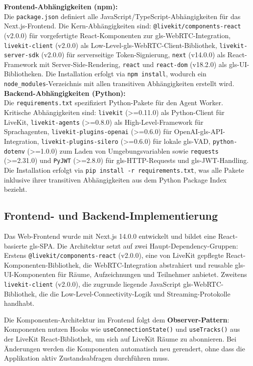\textbf{Frontend-Abhängigkeiten (npm):}\\
Die \texttt{package.json} definiert alle JavaScript/TypeScript-Abhängigkeiten für das Next.js-Frontend. Die Kern-Abhängigkeiten sind: \texttt{@livekit/components-react} (v2.0.0) für vorgefertigte React-Komponenten zur \gls{gls-WebRTC}-Integration, \texttt{livekit-client} (v2.0.0) als Low-Level-\gls{gls-WebRTC}-Client-Bibliothek, \texttt{livekit-server-sdk} (v2.0.0) für serverseitige Token-Signierung, \texttt{next} (v14.0.0) als React-Framework mit Server-Side-Rendering, \texttt{react} und \texttt{react-dom} (v18.2.0) als \gls{gls-UI}-Bibliotheken. Die Installation erfolgt via \texttt{npm install}, wodurch ein \texttt{node\_modules}-Verzeichnis mit allen transitiven Abhängigkeiten erstellt wird.
\clearpage
\textbf{Backend-Abhängigkeiten (Python):}\\
Die \texttt{requirements.txt} spezifiziert Python-Pakete für den Agent Worker. Kritische Abhängigkeiten sind: \texttt{livekit} (>=0.11.0) als Python-Client für LiveKit, \texttt{livekit-agents} (>=0.8.0) als High-Level-Framework für Sprachagenten, \texttt{livekit-plugins-openai} (>=0.6.0) für OpenAI-\gls{gls-API}-Integration, \texttt{livekit-plugins-silero} (>=0.6.0) für lokale \gls{gls-VAD}, \texttt{python-dotenv} (>=1.0.0) zum Laden von Umgebungsvariablen sowie \texttt{requests} (>=2.31.0) und \texttt{PyJWT} (>=2.8.0) für \gls{gls-HTTP}-Requests und \gls{gls-JWT}-Handling. Die Installation erfolgt via \texttt{pip install -r requirements.txt}, was alle Pakete inklusive ihrer transitiven Abhängigkeiten aus dem Python Package Index bezieht.

\subsection{Frontend- und Backend-Implementierung}

Das Web-Frontend wurde mit Next.js 14.0.0 entwickelt und bildet eine React-basierte \gls{gls-SPA}. Die Architektur setzt auf zwei Haupt-Dependency-Gruppen: Erstens \texttt{@livekit/components-react} (v2.0.0), eine von LiveKit gepflegte React-Komponenten-Bibliothek, die WebRTC-Integration abstrahiert und reusable \gls{gls-UI}-Komponenten für Räume, Aufzeichnungen und Teilnehmer anbietet. Zweitens \texttt{livekit-client} (v2.0.0), die zugrunde liegende JavaScript \gls{gls-WebRTC}-Bibliothek, die die Low-Level-Connectivity-Logik und
Streaming-Protokolle handhabt.

Die Komponenten-Architektur im Frontend folgt dem \textbf{Observer-Pattern}: Komponenten nutzen Hooks wie \texttt{useConnectionState()} und \texttt{useTracks()} aus der LiveKit React-Bibliothek, um sich auf LiveKit Räume zu abonnieren. Bei Änderungen werden die Komponenten automatisch neu gerendert, ohne dass die Applikation aktiv Zustandsabfragen durchführen muss.

